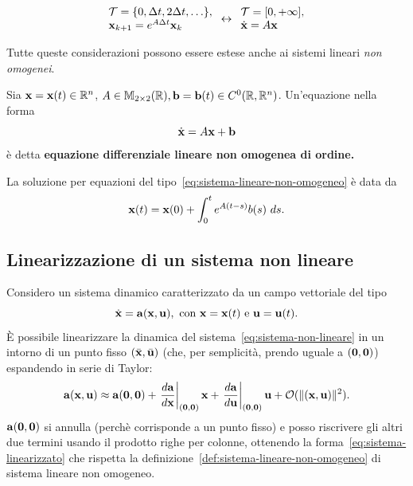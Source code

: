 \begin{equation}
    \begin{array}{l}
        \mathcal T = \{0, \Delta t, 2\Delta t, \ldots\}, \\
        \mathbf{x}_{k+1} = e^{A \Delta t} \mathbf{x}_k
    \end{array}
        \leftrightarrow
    \begin{array}{l}
        \mathcal T = [0, +\infty ], \\
        \dot{\mathbf{x}} = A \mathbf{x}
    \end{array}
    \label{eq:mapping-sistema}
\end{equation}

Tutte queste considerazioni possono essere estese anche ai sistemi lineari
\emph{non omogenei}.


\begin{definition}
    Sia $\mathbf{x} = \mathbf{x}(t) \in \mathbb{R}^n$, $A \in \mathbb{M}_{2\times 2}(\mathbb{R}), \mathbf{b} = \mathbf{b}(t) \in C^0(\mathbb{R}, \mathbb{R}^n)$.
    Un'equazione nella forma
    \begin{equation}
        \dot{\mathbf{x}} = A \mathbf{x} + \mathbf{b}
        \label{eq:sistema-lineare-non-omogeneo}
    \end{equation}
    è detta \textbf{equazione differenziale lineare non omogenea di  ordine.}
    \label{def:sistema-lineare-non-omogeneo}
\end{definition}

La soluzione per equazioni del tipo~\eqref{eq:sistema-lineare-non-omogeneo} è data da
\begin{equation}
    \mathbf{x}(t) = \mathbf{x}(0) + \int_{0}^{t} e^{A(t-s)} b(s) \ ds.
    \label{eq:soluzione-lineare-non-omogeneo}
\end{equation}

\subsection{Linearizzazione di un sistema non lineare}
Considero un sistema dinamico caratterizzato da un campo vettoriale del tipo
\begin{equation}
    \dot {\b x} = \b a(\b x, \b u),\ \text{con}\ \b x = \b x (t)\ \text e\ \b u = \b u (t).
    \label{eq:sistema-non-lineare}
\end{equation}
È possibile linearizzare la dinamica del sistema~\eqref{eq:sistema-non-lineare} in un intorno di un punto fisso
$(\bar{\mathbf{x}}, \bar{\mathbf{u}})$ (che, per semplicità, prendo uguale a $(\mathbf{0}, \mathbf{0})$) espandendo
in serie di Taylor:
\begin{equation*}
    \mathbf{a}(\mathbf{x}, \mathbf{u}) \approx \mathbf{a}(\mathbf{0}, \mathbf{0}) +
    \left.\frac{d \mathbf{a}}{d \mathbf{x}}\right|_{(\mathbf{0}, \mathbf{0})} \mathbf{x} +
    \left.\frac{d \mathbf{a}}{d \mathbf{u}}\right|_{(\mathbf{0}, \mathbf{0})} \mathbf{u} + \mathcal O(\lVert(\mathbf{x}, \mathbf{u})\rVert^2).
\end{equation*}
$\mathbf{a}(\mathbf{0}, \mathbf{0})$ si annulla (perchè corrisponde a un punto fisso) e posso riscrivere
gli altri due termini usando il prodotto righe per colonne, ottenendo la forma~\ref{eq:sistema-linearizzato}
che rispetta la definizione~\ref{def:sistema-lineare-non-omogeneo} di sistema lineare
non omogeneo.

